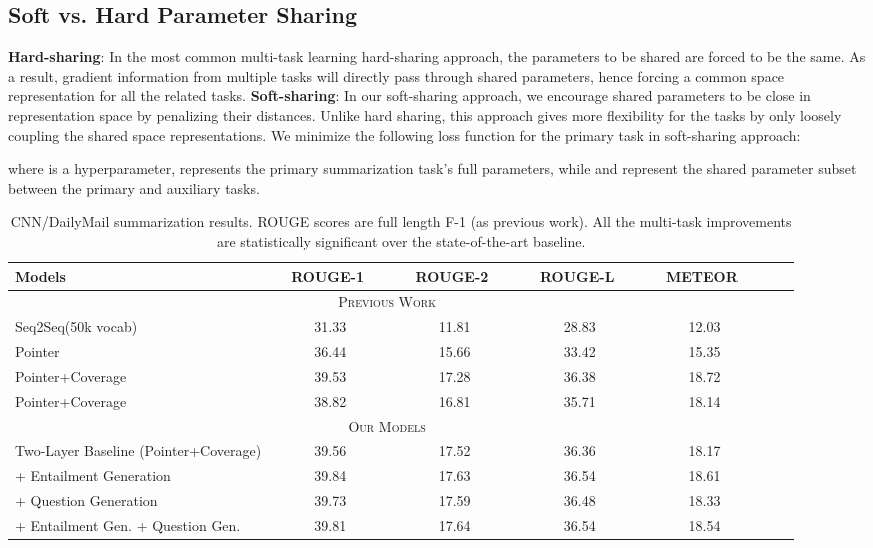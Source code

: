 \documentclass[11pt,a4paper]{article}
\begin{document}
\subsection{Soft vs. Hard Parameter Sharing}
\label{subsec:soft-vs-hard}

\noindent\textbf{Hard-sharing}: In the most common multi-task learning hard-sharing approach, the parameters to be shared are forced to be the same. As a result, gradient information from multiple tasks will directly pass through shared parameters, hence forcing a common space representation for all the related tasks.
\noindent\textbf{Soft-sharing}:
In our soft-sharing approach, we encourage shared parameters to be close in representation space by penalizing their  distances. Unlike hard sharing, this approach gives more flexibility for the tasks by only loosely coupling the shared space representations. We minimize the following loss function for the primary task in soft-sharing approach:
\vspace{-5pt}

where  is a hyperparameter,  represents the primary summarization task's full parameters, while  and  represent the shared parameter subset between the primary and auxiliary tasks. 


\begin{table*}
\begin{center}
\begin{small}
\begin{tabular}{|l|c|c|c|c|c|c|}
\hline
Models & \ \ ROUGE-1 \ \  & \ \ ROUGE-2 \ \ & \ \ ROUGE-L \ \ & \ \ METEOR \ \ \\
\hline
\multicolumn{5}{|c|}{\textsc{Previous Work}}\\
\hline
Seq2Seq(50k vocab)~\cite{see2017get} & 31.33 & 11.81 & 28.83 & 12.03  \\
Pointer~\cite{see2017get} & 36.44 & 15.66 & 33.42 & 15.35 \\
Pointer+Coverage~\cite{see2017get}  & 39.53 & 17.28 & 36.38 & 18.72  \\
Pointer+Coverage~\cite{see2017get}  & 38.82 & 16.81 & 35.71 & 18.14 \\
\hline
\multicolumn{5}{|c|}{\textsc{Our Models}}\\
\hline
Two-Layer Baseline (Pointer+Coverage)  & 39.56 & 17.52 & 36.36  & 18.17 \\
 + Entailment Generation & 39.84 & 17.63 & 36.54 & 18.61 \\
 + Question Generation & 39.73 & 17.59 & 36.48 & 18.33  \\
 + Entailment Gen. + Question Gen. & 39.81 & 17.64 & 36.54 & 18.54 \\
\hline
\end{tabular}
\end{small}
\end{center}
\vspace{-10pt}
\caption{CNN/DailyMail summarization results. ROUGE scores are full length F-1 (as previous work). 
All the multi-task improvements are statistically significant over the state-of-the-art baseline.
\vspace{-10pt}
}
\label{table:cnndm_results}
\end{table*}
\end{document}
